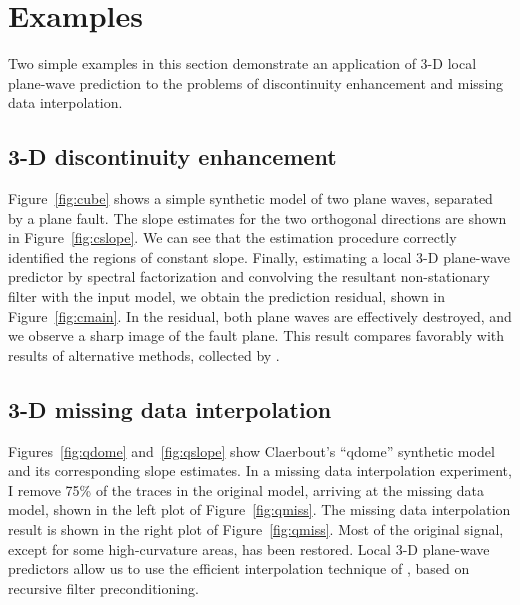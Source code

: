 \section{Examples}
Two simple examples in this section demonstrate an application of 3-D
local plane-wave prediction to the problems of discontinuity
enhancement and missing data interpolation.

\subsection{3-D discontinuity enhancement}

\par
Figure~\ref{fig:cube} shows a simple synthetic model of two plane
waves, separated by a plane fault. The slope estimates for the two
orthogonal directions are shown in Figure~\ref{fig:cslope}. We can see
that the estimation procedure correctly identified the regions of
constant slope. Finally, estimating a local 3-D plane-wave predictor by
spectral factorization and convolving the resultant non-stationary
filter with the input model, we obtain the prediction residual, shown
in Figure~\ref{fig:cmain}. In the residual, both plane waves are
effectively destroyed, and we observe a sharp image of the fault
plane. This result compares favorably with results of alternative
methods, collected by \cite[]{Schwab.sepphd.99}.
\subsection{3-D missing data interpolation}


Figures~\ref{fig:qdome} and~\ref{fig:qslope} show Claerbout's
``qdome'' synthetic model \cite[]{Claerbout.sep.77.19,gee} and its
corresponding slope estimates. In a missing data interpolation
experiment, I remove 75\% of the traces in the original model,
arriving at the missing data model, shown in the left plot of
Figure~\ref{fig:qmiss}. The missing data interpolation result is shown
in the right plot of Figure~\ref{fig:qmiss}. Most of the original
signal, except for some high-curvature areas, has been restored. Local
3-D plane-wave predictors allow us to use the efficient interpolation
technique of \cite{Fomel.sep.95.sergey1}, based on recursive
filter preconditioning.

